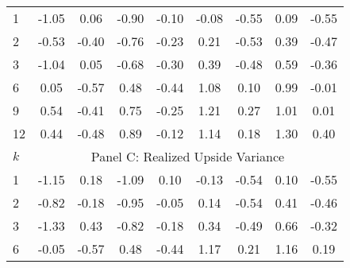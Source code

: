 \documentclass[11pt]{article}
\begin{document}
\begin{table}
\begin{center}
\begin{tabular}{lllllllll}
\hline
1 & \multicolumn{1}{c}{-1.05} & \multicolumn{1}{c}{0.06} & \multicolumn{1}{c}{-0.90} & \multicolumn{1}{c}{-0.10} & \multicolumn{1}{c}{-0.08} & \multicolumn{1}{c}{-0.55} & \multicolumn{1}{c}{0.09} & \multicolumn{1}{c}{-0.55} \\
2 & \multicolumn{1}{c}{-0.53} & \multicolumn{1}{c}{-0.40} & \multicolumn{1}{c}{-0.76} & \multicolumn{1}{c}{-0.23} & \multicolumn{1}{c}{0.21} & \multicolumn{1}{c}{-0.53} & \multicolumn{1}{c}{0.39} & \multicolumn{1}{c}{-0.47} \\
3 & \multicolumn{1}{c}{-1.04} & \multicolumn{1}{c}{0.05} & \multicolumn{1}{c}{-0.68} & \multicolumn{1}{c}{-0.30} & \multicolumn{1}{c}{0.39} & \multicolumn{1}{c}{-0.48} & \multicolumn{1}{c}{0.59} & \multicolumn{1}{c}{-0.36} \\
6 & \multicolumn{1}{c}{0.05} & \multicolumn{1}{c}{-0.57} & \multicolumn{1}{c}{0.48} & \multicolumn{1}{c}{-0.44} & \multicolumn{1}{c}{1.08} & \multicolumn{1}{c}{0.10} & \multicolumn{1}{c}{0.99} & \multicolumn{1}{c}{-0.01} \\
9 & \multicolumn{1}{c}{0.54} & \multicolumn{1}{c}{-0.41} & \multicolumn{1}{c}{0.75} & \multicolumn{1}{c}{-0.25} & \multicolumn{1}{c}{1.21} & \multicolumn{1}{c}{0.27} & \multicolumn{1}{c}{1.01} & \multicolumn{1}{c}{0.01} \\
12 & \multicolumn{1}{c}{0.44} & \multicolumn{1}{c}{-0.48} & \multicolumn{1}{c}{0.89} & \multicolumn{1}{c}{-0.12} & \multicolumn{1}{c}{1.14} & \multicolumn{1}{c}{0.18} & \multicolumn{1}{c}{1.30} & \multicolumn{1}{c}{0.40} \\
\hline
$k$ & \multicolumn{8}{c}{Panel C: Realized Upside Variance} \\
\hline
1 & \multicolumn{1}{c}{-1.15} & \multicolumn{1}{c}{0.18} & \multicolumn{1}{c}{-1.09} & \multicolumn{1}{c}{0.10} & \multicolumn{1}{c}{-0.13} & \multicolumn{1}{c}{-0.54} & \multicolumn{1}{c}{0.10} & \multicolumn{1}{c}{-0.55} \\
2 & \multicolumn{1}{c}{-0.82} & \multicolumn{1}{c}{-0.18} & \multicolumn{1}{c}{-0.95} & \multicolumn{1}{c}{-0.05} & \multicolumn{1}{c}{0.14} & \multicolumn{1}{c}{-0.54} & \multicolumn{1}{c}{0.41} & \multicolumn{1}{c}{-0.46} \\
3 & \multicolumn{1}{c}{-1.33} & \multicolumn{1}{c}{0.43} & \multicolumn{1}{c}{-0.82} & \multicolumn{1}{c}{-0.18} & \multicolumn{1}{c}{0.34} & \multicolumn{1}{c}{-0.49} & \multicolumn{1}{c}{0.66} & \multicolumn{1}{c}{-0.32} \\
6 & \multicolumn{1}{c}{-0.05} & \multicolumn{1}{c}{-0.57} & \multicolumn{1}{c}{0.48} & \multicolumn{1}{c}{-0.44} & \multicolumn{1}{c}{1.17} & \multicolumn{1}{c}{0.21} & \multicolumn{1}{c}{1.16} & \multicolumn{1}{c}{0.19} \\

\end{tabular}
\end{center}
\end{table}
\end{document}
